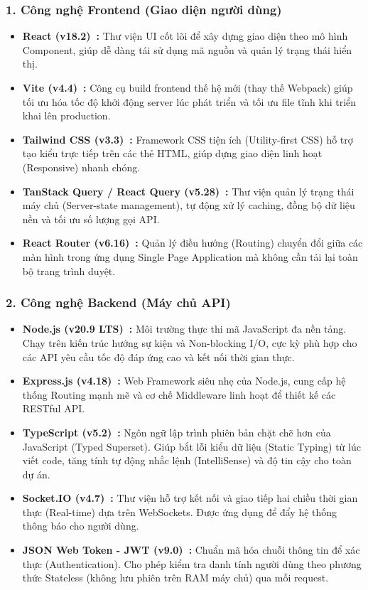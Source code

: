 \subsubsection*{1. Công nghệ Frontend (Giao diện người dùng)}
\begin{itemize}[leftmargin=1.5em]
    \item \textbf{React (v18.2)~\cite{ReactJSDocs}:} Thư viện UI cốt lõi để xây dựng giao diện theo mô hình Component, giúp dễ dàng tái sử dụng mã nguồn và quản lý trạng thái hiển thị.
    \item \textbf{Vite (v4.4)~\cite{ViteDocs}:} Công cụ build frontend thế hệ mới (thay thế Webpack) giúp tối ưu hóa tốc độ khởi động server lúc phát triển và tối ưu file tĩnh khi triển khai lên production.
    \item \textbf{Tailwind CSS (v3.3)~\cite{TailwindCSSDocs}:} Framework CSS tiện ích (Utility-first CSS) hỗ trợ tạo kiểu trực tiếp trên các thẻ HTML, giúp dựng giao diện linh hoạt (Responsive) nhanh chóng.
    \item \textbf{TanStack Query / React Query (v5.28)~\cite{TanStackQuery}:} Thư viện quản lý trạng thái máy chủ (Server-state management), tự động xử lý caching, đồng bộ dữ liệu nền và tối ưu số lượng gọi API.
    \item \textbf{React Router (v6.16)~\cite{ReactRouterDocs}:} Quản lý điều hướng (Routing) chuyển đổi giữa các màn hình trong ứng dụng Single Page Application mà không cần tải lại toàn bộ trang trình duyệt.
\end{itemize}

\subsubsection*{2. Công nghệ Backend (Máy chủ API)}
\begin{itemize}[leftmargin=1.5em]
    \item \textbf{Node.js (v20.9 LTS)~\cite{NodeJSDocs}:} Môi trường thực thi mã JavaScript đa nền tảng. Chạy trên kiến trúc hướng sự kiện và Non-blocking I/O, cực kỳ phù hợp cho các API yêu cầu tốc độ đáp ứng cao và kết nối thời gian thực.
    \item \textbf{Express.js (v4.18)~\cite{ExpressJSDocs}:} Web Framework siêu nhẹ của Node.js, cung cấp hệ thống Routing mạnh mẽ và cơ chế Middleware linh hoạt để thiết kế các RESTful API.
    \item \textbf{TypeScript (v5.2)~\cite{TypeScriptDocs}:} Ngôn ngữ lập trình phiên bản chặt chẽ hơn của JavaScript (Typed Superset). Giúp bắt lỗi kiểu dữ liệu (Static Typing) từ lúc viết code, tăng tính tự động nhắc lệnh (IntelliSense) và độ tin cậy cho toàn dự án.
    \item \textbf{Socket.IO (v4.7)~\cite{SocketIODocs}:} Thư viện hỗ trợ kết nối và giao tiếp hai chiều thời gian thực (Real-time) dựa trên WebSockets. Được ứng dụng để đẩy hệ thống thông báo cho người dùng.
    \item \textbf{JSON Web Token - JWT (v9.0)~\cite{JWTSpec}:} Chuẩn mã hóa chuỗi thông tin để xác thực (Authentication). Cho phép kiểm tra danh tính người dùng theo phương thức Stateless (không lưu phiên trên RAM máy chủ) qua mỗi request.
\end{itemize}

